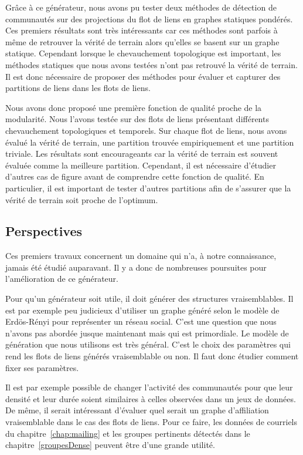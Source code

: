 Grâce à ce générateur, nous avons pu tester deux méthodes de détection de communautés sur des projections du flot de liens en graphes statiques pondérés.
Ces premiers résultats sont très intéressants car ces méthodes sont parfois à même de retrouver la vérité de terrain alors qu'elles se basent sur un graphe statique.
Cependant lorsque le chevauchement topologique est important, les méthodes statiques que nous avons testées n'ont pas retrouvé la vérité de terrain.
Il est donc nécessaire de proposer des méthodes pour évaluer et capturer des partitions de liens dans les flots de liens.

Nous avons donc proposé une première fonction de qualité proche de la modularité.
Nous l'avons testée sur des flots de liens présentant différents chevauchement topologiques et temporels.
Sur chaque flot de liens, nous avons évalué la vérité de terrain, une partition trouvée empiriquement et une partition triviale.
Les résultats sont encourageants car la vérité de terrain est souvent évaluée comme la meilleure partition.
Cependant, il est nécessaire d'étudier d'autres cas de figure avant de comprendre cette fonction de qualité.
En particulier, il est important de tester d'autres partitions afin de s'assurer que la vérité de terrain soit proche de l'optimum.


\subsection{Perspectives}
Ces premiers travaux concernent un domaine qui n'a, à notre connaissance, jamais été étudié auparavant.
Il y a donc de nombreuses poursuites pour l'amélioration de ce générateur.


Pour qu'un générateur soit utile, il doit générer des structures vraisemblables.
Il est par exemple peu judicieux d'utiliser un graphe généré selon le modèle de Erdös-Rényi pour représenter un réseau social.
C'est une question que nous n'avons pas abordée jusque maintenant mais qui est primordiale.
Le modèle de génération que nous utilisons est très général.
C'est le choix des paramètres qui rend les flots de liens générés vraisemblable ou non.
Il faut donc étudier comment fixer ses paramètres.

Il est par exemple possible de changer l'activité des communautés pour que leur densité et leur durée soient similaires à celles observées dans un jeux de données.
De même, il serait intéressant d'évaluer quel serait un graphe d'affiliation vraisemblable dans le cas des flots de liens.
Pour ce faire, les données de courriels du chapitre~\ref{chap:mailing} et les groupes pertinents détectés dans le chapitre~\ref{groupesDense} peuvent être d'une grande utilité.

